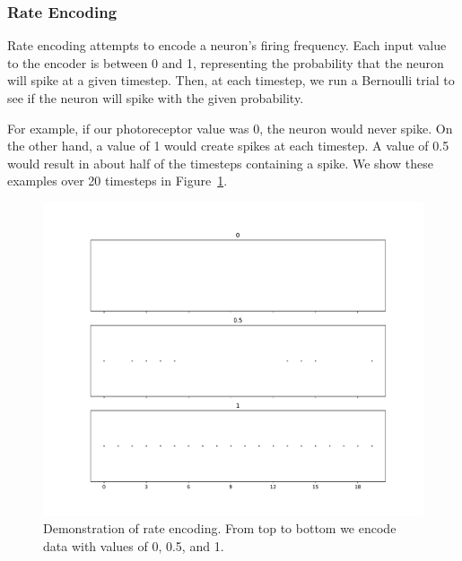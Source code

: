 \documentclass [MS] {UCLAthesis}
\begin{document}
\subsubsection{Rate Encoding}

Rate encoding attempts to encode a neuron's firing frequency. Each input value to the encoder is between 0 and 1, representing the probability that the neuron will spike at a given timestep. Then, at each timestep, we run a Bernoulli trial to see if the neuron will spike with the given probability.

For example, if our photoreceptor value was 0, the neuron would never spike. On the other hand, a value of 1 would create spikes at each timestep. A value of 0.5 would result in about half of the timesteps containing a spike. We show these examples over 20 timesteps in Figure~\ref{fig:rate_encode_3plots}.

\begin{figure}
    \centering
    \includegraphics[width=1.0\textwidth]{neuron_3_rate}
    \caption[Rate encoding with Bernoulli trials]{Demonstration of rate encoding. From top to bottom we encode data with values of 0, 0.5, and 1.}
    \label{fig:rate_encode_3plots}
\end{figure}
\end{document}
